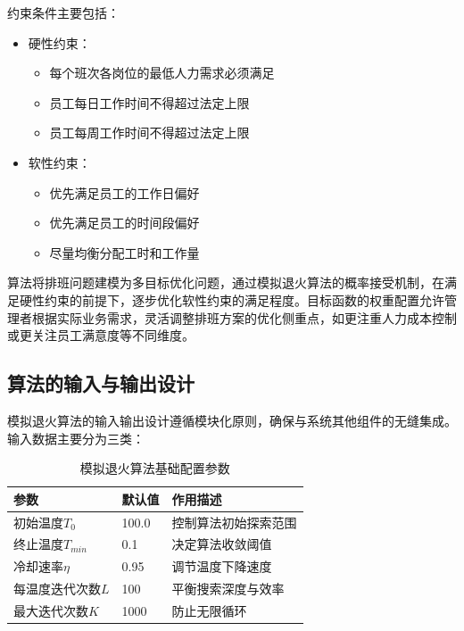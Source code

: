 \documentclass{ctexart}
\begin{document}
约束条件主要包括：
\begin{itemize}
    \item 硬性约束：
    \begin{itemize}
        \item 每个班次各岗位的最低人力需求必须满足
        \item 员工每日工作时间不得超过法定上限
        \item 员工每周工作时间不得超过法定上限
    \end{itemize}
    \item 软性约束：
    \begin{itemize}
        \item 优先满足员工的工作日偏好
        \item 优先满足员工的时间段偏好
        \item 尽量均衡分配工时和工作量
    \end{itemize}
\end{itemize}

算法将排班问题建模为多目标优化问题，通过模拟退火算法的概率接受机制，在满足硬性约束的前提下，逐步优化软性约束的满足程度。目标函数的权重配置允许管理者根据实际业务需求，灵活调整排班方案的优化侧重点，如更注重人力成本控制或更关注员工满意度等不同维度。

\subsection{算法的输入与输出设计}
模拟退火算法的输入输出设计遵循模块化原则，确保与系统其他组件的无缝集成。输入数据主要分为三类：

\begin{table}[H]
    \centering
    \caption{模拟退火算法基础配置参数}
    \label{tab:sa-config}
    \begin{tabular}{lll}
    \toprule
    参数 & 默认值 & 作用描述 \\
    \midrule
    初始温度$T_0$ & 100.0 & 控制算法初始探索范围 \\
    终止温度$T_{min}$ & 0.1 & 决定算法收敛阈值 \\
    冷却速率$\eta$ & 0.95 & 调节温度下降速度 \\
    每温度迭代次数$L$ & 100 & 平衡搜索深度与效率 \\
    最大迭代次数$K$ & 1000 & 防止无限循环 \\
    \bottomrule
    \end{tabular}
\end{table}
\end{document}
